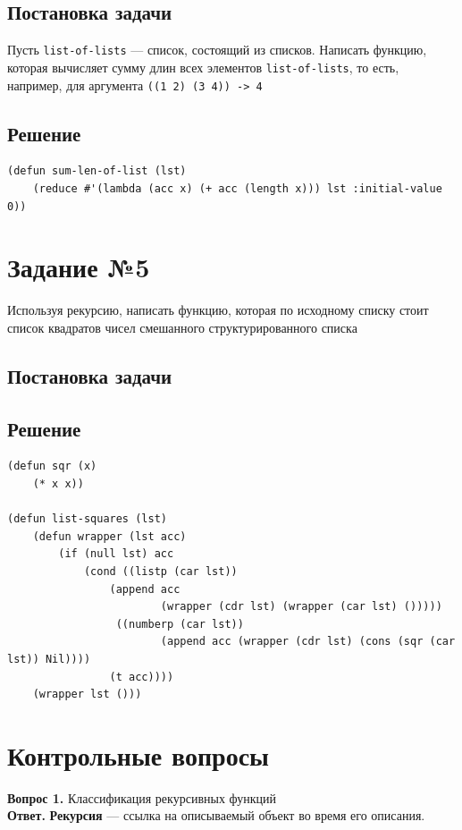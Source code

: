\documentclass[12pt]{report}
\begin{document}
\subsection*{Постановка задачи}
Пусть \texttt{list-of-lists} --- список, состоящий из списков. Написать функцию, которая вычисляет сумму длин всех элементов \texttt{list-of-lists}, то есть, например, для аргумента \texttt{((1 2) (3 4)) -> 4}

\subsection*{Решение}
\begin{lstlisting}
(defun sum-len-of-list (lst)
	(reduce #'(lambda (acc x) (+ acc (length x))) lst :initial-value 0))
\end{lstlisting}

\section*{Задание №5}
Используя рекурсию, написать функцию, которая по исходному списку стоит список квадратов чисел смешанного структурированного списка

\subsection*{Постановка задачи}
\subsection*{Решение}
\begin{lstlisting}
(defun sqr (x)
	(* x x))

(defun list-squares (lst)
	(defun wrapper (lst acc)
		(if (null lst) acc
			(cond ((listp (car lst))
				(append acc
						(wrapper (cdr lst) (wrapper (car lst) ()))))
				 ((numberp (car lst))
						(append acc (wrapper (cdr lst) (cons (sqr (car lst)) Nil))))
				(t acc))))
	(wrapper lst ()))
\end{lstlisting}

\section*{Контрольные вопросы}
\textbf{Вопрос 1.} Классификация рекурсивных функций\\

\textbf{Ответ.} \textbf{Рекурсия} --- ссылка на описываемый объект во время его описания.\\
\end{document}
